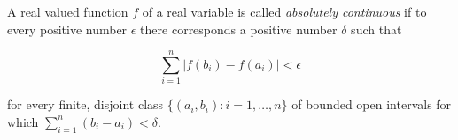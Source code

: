 A real valued function $f$ of a real variable is called \textit{absolutely continuous} if to every positive number $\epsilon$ there corresponds a positive number $\delta$ such that

$$\sum_{i=1}^{n} |f(b_i) - f(a_i)| < \epsilon$$

for every finite, disjoint class $\{(a_i, b_i): i = 1, \dots, n\}$ of bounded open intervals for which $\sum_{i=1}^{n}(b_i - a_i) < \delta$.

